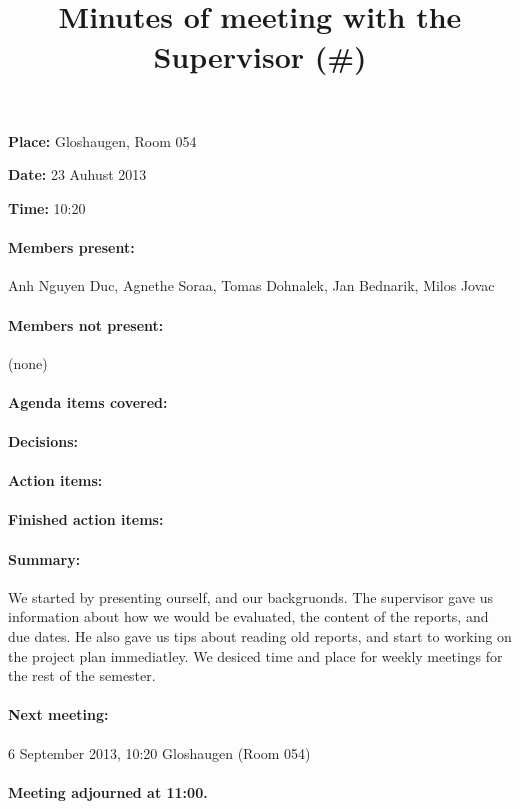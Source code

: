 \documentclass[paper=a4, fontsize=11pt]{article} %
\title{
\horrule{0.5pt} \\[0.4cm] %
\huge Minutes of meeting with the Supervisor (\#\meetingNumber)
\horrule{2pt} \\[-0.9cm] %
}
\newcommand{\meetingPlace} {Gloshaugen, Room 054}
\newcommand{\meetingDate}  {23 Auhust 2013}
\newcommand{\meetingTime}  {10:20}
\newcommand{\membersPresent} {  Anh Nguyen Duc,
                                Agnethe Soraa,
                                Tomas Dohnalek,
                                Jan Bednarik,
                                Milos Jovac}
\newcommand{\membersMissing} {(none)}
\newcommand{\summary} {
We started by presenting ourself, and our backgruonds. The supervisor gave us information about how we would be evaluated, the content of the reports, and due dates. He also gave us tips about reading old reports, and start to working on the project plan immediatley. We desiced time and place for weekly meetings for the rest of the semester.
}
\newcommand{\nextMeeting} {6 September 2013, 10:20 Gloshaugen (Room 054)}
\newcommand{\meetingEnd} {11:00}
\newcounter{foocounter}
\begin{document}
\date{}
\maketitle %

\textbf{Place:} \meetingPlace

\textbf{Date:}  \meetingDate

\textbf{Time:}  \meetingTime

\paragraph{Members present:} \membersPresent

\paragraph{Members not present:} \membersMissing

\paragraph{Agenda items covered:} \hspace{0pt}
\setcounter{foocounter}{0}

\paragraph{Decisions:} \hspace{0pt}
\setcounter{foocounter}{0}

\paragraph{Action items:} \hspace{0pt}
\setcounter{foocounter}{0}

\paragraph{Finished action items:} \hspace{0pt}
\setcounter{foocounter}{0}

\paragraph{Summary:} \summary

\paragraph{Next meeting:} \nextMeeting

\paragraph{Meeting adjourned at \meetingEnd.}
\end{document}
